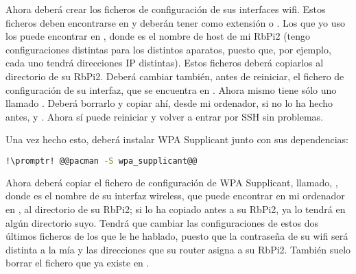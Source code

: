 Ahora deberá crear los ficheros de configuración de sus interfaces wifi. Estos ficheros deben encontrarse en
 y deberán tener como extensión  o . Los que yo uso los
puede encontrar en , donde  es el nombre de host de
mi RbPi2 (tengo configuraciones distintas para los distintos aparatos, puesto que, por ejemplo, cada uno tendrá
direcciones IP distintas). Estos ficheros deberá copiarlos al directorio  de su
RbPi2. Deberá cambiar también, antes de reiniciar, el fichero de configuración de su interfaz, que se encuentra
en . Ahora mismo tiene sólo uno llamado . Deberá borrarlo y
copiar ahí, desde mi ordenador, si no lo ha hecho antes, 
y . Ahora sí puede reiniciar y volver a entrar por SSH sin
problemas.

Una vez hecho esto, deberá instalar WPA Supplicant junto con sus dependencias:

\begin{lstlisting}[gobble=2,language=bash,style=bashinteract,escapechar=!]
  !\promptr! @@pacman -S wpa_supplicant@@
\end{lstlisting}

Ahora deberá copiar el fichero de configuración de WPA Supplicant, llamado, ,
donde  es el nombre de su interfaz wireless, que puede encontrar en mi ordenador en
, al directorio  de su RbPi2; si lo ha
copiado antes a su RbPi2, ya lo tendrá en algún directorio suyo. Tendrá que cambiar las configuraciones de estos
dos últimos ficheros de los que le he hablado, puesto que la contraseña de su wifi será distinta a la mía y las
direcciones que su router asigna a su RbPi2. También suelo borrar el fichero  que ya
existe en .


